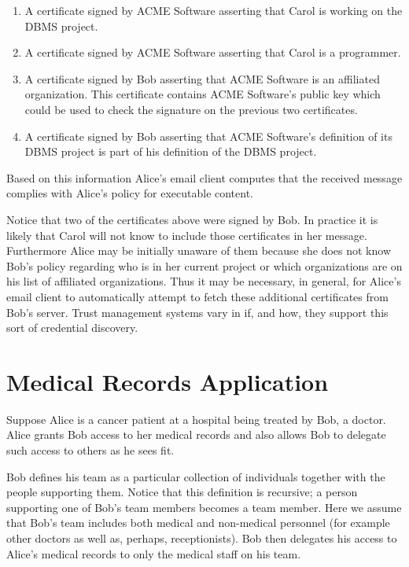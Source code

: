 \documentclass{article}
\begin{document}
\begin{enumerate}
\item A certificate signed by ACME Software asserting that Carol is working
  on the DBMS project.

\item A certificate signed by ACME Software asserting that Carol is a
  programmer.

\item A certificate signed by Bob asserting that ACME Software is an
  affiliated organization. This certificate contains ACME Software's public
  key which could be used to check the signature on the previous two
  certificates.

\item A certificate signed by Bob asserting that ACME Software's definition
  of its DBMS project is part of his definition of the DBMS project.
\end{enumerate}

Based on this information Alice's email client computes that the received
message complies with Alice's policy for executable content.

Notice that two of the certificates above were signed by Bob. In practice
it is likely that Carol will not know to include those certificates in her
message. Furthermore Alice may be initially unaware of them because she
does not know Bob's policy regarding who is in her current project or which
organizations are on his list of affiliated organizations. Thus it may be
necessary, in general, for Alice's email client to automatically attempt to
fetch these additional certificates from Bob's server. Trust management
systems vary in if, and how, they support this sort of credential
discovery.

\section{Medical Records Application}

%
%
%

Suppose Alice is a cancer patient at a hospital being treated by Bob, a
doctor. Alice grants Bob access to her medical records and also allows Bob
to delegate such access to others as he sees fit.

Bob defines his team as a particular collection of individuals together
with the people supporting them. Notice that this definition is recursive;
a person supporting one of Bob's team members becomes a team member. Here
we assume that Bob's team includes both medical and non-medical personnel
(for example other doctors as well as, perhaps, receptionists). Bob then
delegates his access to Alice's medical records to only the medical staff
on his team.
\end{document}
